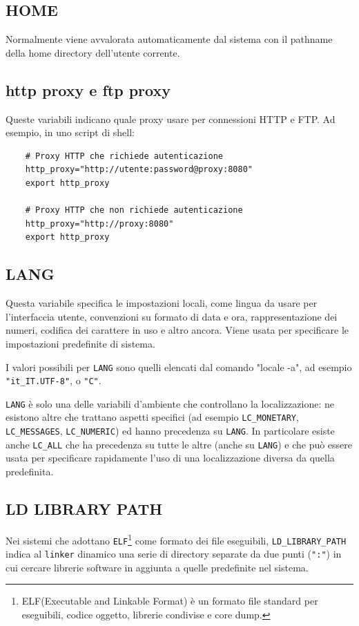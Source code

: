 \documentclass[11pt]{book}
\begin{document}
\subsection{HOME}
Normalmente viene avvalorata automaticamente dal sistema con il pathname della home directory dell'utente corrente. 

\subsection{http proxy e ftp proxy}
 Queste variabili indicano quale proxy usare per connessioni HTTP e FTP. Ad esempio, in uno script di shell: 
 \begin{verbatim}
 	# Proxy HTTP che richiede autenticazione
 	http_proxy="http://utente:password@proxy:8080"
 	export http_proxy
 	
 	# Proxy HTTP che non richiede autenticazione
 	http_proxy="http://proxy:8080"
 	export http_proxy
 \end{verbatim}

\subsection{LANG}
Questa variabile specifica le impostazioni locali, come lingua da usare per l'interfaccia utente, convenzioni su formato di data e ora, rappresentazione dei numeri, codifica dei carattere in uso e altro ancora. Viene usata per specificare le impostazioni predefinite di sistema.

I valori possibili per \verb*|LANG| sono quelli elencati dal comando "locale -a", ad esempio \verb*|"it_IT.UTF-8"|, o \verb*|"C"|.

\verb*|LANG| è solo una delle variabili d'ambiente che controllano la localizzazione: ne esistono altre che trattano aspetti specifici (ad esempio \verb*|LC_MONETARY|, \verb*|LC_MESSAGES|, \verb*|LC_NUMERIC|) ed hanno precedenza su \verb*|LANG|. In particolare esiste anche \verb*|LC_ALL| che ha precedenza su tutte le altre (anche su \verb*|LANG|) e che può essere usata per specificare rapidamente l'uso di una localizzazione diversa da quella predefinita. 

\subsection{LD LIBRARY PATH}
Nei sistemi che adottano \verb*|ELF|\footnote{ELF(Executable and Linkable Format) è un formato file standard per eseguibili, codice oggetto, librerie condivise e core dump.} come formato dei file eseguibili, \verb*|LD_LIBRARY_PATH| indica al \verb*|linker| dinamico una serie di directory separate da due punti (\verb*|":"|) in cui cercare librerie software in aggiunta a quelle predefinite nel sistema. 
\end{document}
